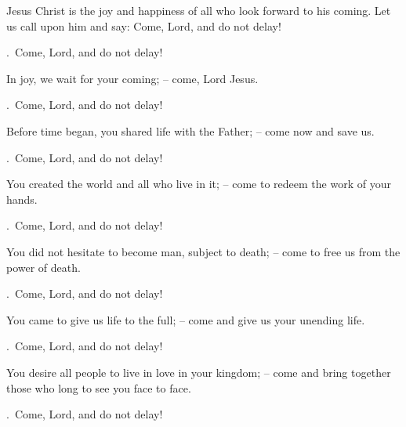 \lettrine[loversize=0.15,lines=2]{J}{}esus Christ is the joy and happiness of all who look forward to his coming. Let us call upon him and say: Come, Lord, and do not delay!
\par \Rbar.~Come, Lord, and do not delay!

In joy, we wait for your coming;
– come, Lord Jesus.
\par \Rbar.~Come, Lord, and do not delay!

Before time began, you shared life with the Father;
– come now and save us.
\par \Rbar.~Come, Lord, and do not delay!

You created the world and all who live in it;
– come to redeem the work of your hands.
\par \Rbar.~Come, Lord, and do not delay!

You did not hesitate to become man, subject to death;
– come to free us from the power of death.
\par \Rbar.~Come, Lord, and do not delay!

You came to give us life to the full;
– come and give us your unending life.
\par \Rbar.~Come, Lord, and do not delay!

You desire all people to live in love in your kingdom;
– come and bring together those who long to see you face to face.
\par \Rbar.~Come, Lord, and do not delay!
